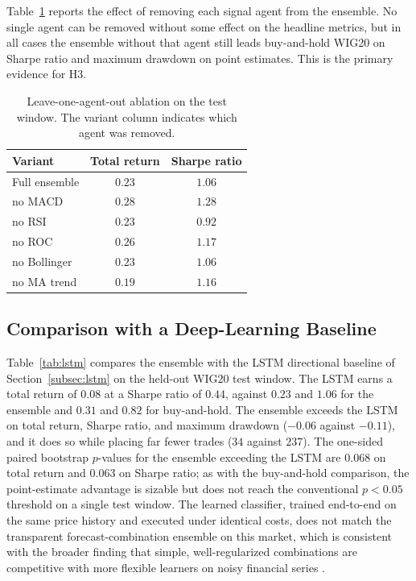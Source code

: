\documentclass{ieeeaccess}
\newcommand{\TRtest}{\ensuremath{0.23}}
\newcommand{\Shtest}{\ensuremath{1.06}}
\newcommand{\MDDtest}{\ensuremath{-0.06}}
\newcommand{\Ntrades}{\ensuremath{34}}
\newcommand{\BHtest}{\ensuremath{0.31}}
\newcommand{\BHsharpe}{\ensuremath{0.82}}
\newcommand{\LSTMtest}{\ensuremath{0.08}}
\newcommand{\LSTMsharpe}{\ensuremath{0.44}}
\newcommand{\LSTMmdd}{\ensuremath{-0.11}}
\newcommand{\LSTMtrades}{\ensuremath{237}}
\newcommand{\PensVsLSTM}{\ensuremath{0.068}}
\newcommand{\PensVsLSTMsharpe}{\ensuremath{0.063}}
\begin{document}
Table~\ref{tab:ablation} reports the effect of removing each signal agent from the ensemble. No single agent can be removed without some effect on the headline metrics, but in all cases the ensemble without that agent still leads buy-and-hold WIG20 on Sharpe ratio and maximum drawdown on point estimates. This is the primary evidence for H3.

\begin{table}[t]
\centering
\caption{Leave-one-agent-out ablation on the test window. The variant column indicates which agent was removed.}
\label{tab:ablation}
\begin{tabular}{lcc}
\toprule
Variant & Total return & Sharpe ratio \\
\midrule
Full ensemble & $\TRtest$ & $\Shtest$ \\
no MACD        & $0.28$ & $1.28$ \\
no RSI         & $0.23$ & $0.92$ \\
no ROC         & $0.26$ & $1.17$ \\
no Bollinger   & $0.23$ & $1.06$ \\
no MA trend    & $0.19$ & $1.16$ \\
\bottomrule
\end{tabular}
\end{table}

\subsection{Comparison with a Deep-Learning Baseline}
\label{subsec:lstm_results}

Table~\ref{tab:lstm} compares the ensemble with the LSTM directional baseline of Section~\ref{subsec:lstm} on the held-out WIG20 test window. The LSTM earns a total return of \LSTMtest{} at a Sharpe ratio of \LSTMsharpe{}, against \TRtest{} and \Shtest{} for the ensemble and \BHtest{} and \BHsharpe{} for buy-and-hold. The ensemble exceeds the LSTM on total return, Sharpe ratio, and maximum drawdown (\MDDtest{} against \LSTMmdd{}), and it does so while placing far fewer trades (\Ntrades{} against \LSTMtrades{}). The one-sided paired bootstrap $p$-values for the ensemble exceeding the LSTM are \PensVsLSTM{} on total return and \PensVsLSTMsharpe{} on Sharpe ratio; as with the buy-and-hold comparison, the point-estimate advantage is sizable but does not reach the conventional $p < 0.05$ threshold on a single test window. The learned classifier, trained end-to-end on the same price history and executed under identical costs, does not match the transparent forecast-combination ensemble on this market, which is consistent with the broader finding that simple, well-regularized combinations are competitive with more flexible learners on noisy financial series \cite{clemen1989,timmermann2006}.
\end{document}
